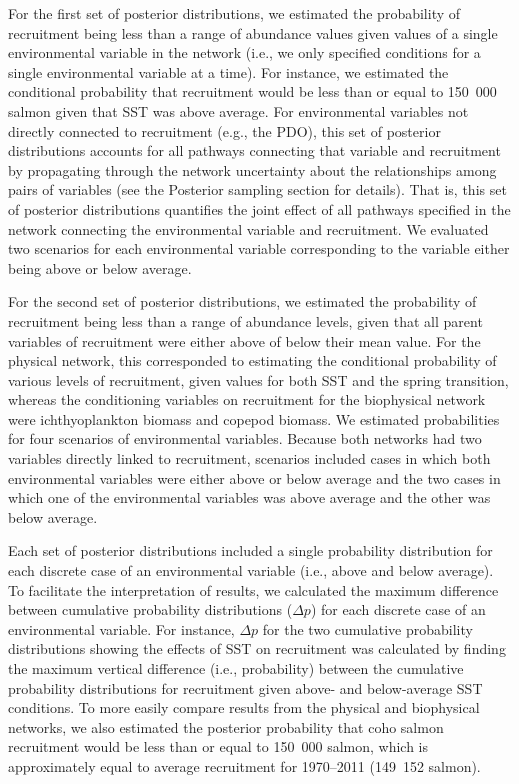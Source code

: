 For the first set of posterior distributions, we estimated the probability of
recruitment being less than a range of abundance values given values of a single
environmental variable in the network (i.e., we only specified conditions for a
single environmental variable at a time). For instance, we estimated the
conditional probability that recruitment would be less than or equal to 150~000
salmon given that SST was above average. For environmental variables not
directly connected to recruitment (e.g., the PDO), this set of posterior
distributions accounts for all pathways connecting that variable and recruitment
by propagating through the network uncertainty about the relationships among
pairs of variables (see the Posterior sampling section for details). That is,
this set of posterior distributions quantifies the joint effect of all pathways
specified in the network connecting the environmental variable and recruitment.
We evaluated two scenarios for each environmental variable corresponding to the
variable either being above or below average.

For the second set of posterior distributions, we estimated the probability of
recruitment being less than a range of abundance levels, given that all parent
variables of recruitment were either above of below their mean value. For the
physical network, this corresponded to estimating the conditional probability of
various levels of recruitment, given values for both SST and the spring
transition, whereas the conditioning variables on recruitment for the
biophysical network were ichthyoplankton biomass and copepod biomass. We
estimated probabilities for four scenarios of environmental variables. Because
both networks had two variables directly linked to recruitment, scenarios
included cases in which both environmental variables were either above or below
average and the two cases in which one of the environmental variables was above
average and the other was below average.

Each set of posterior distributions included a single probability distribution
for each discrete case of an environmental variable (i.e., above and below
average). To facilitate the interpretation of results, we calculated the maximum
difference between cumulative probability distributions (\(\Delta p\)) for each
discrete case of an environmental variable. For instance, \(\Delta p\) for the
two cumulative probability distributions showing the effects of SST on
recruitment was calculated by finding the maximum vertical difference (i.e.,
probability) between the cumulative probability distributions for recruitment
given above- and below-average SST conditions. To more easily compare results
from the physical and biophysical networks, we also estimated the posterior
probability that coho salmon recruitment would be less than or equal to 150~000
salmon, which is approximately equal to average recruitment for 1970--2011
(149~152 salmon).


